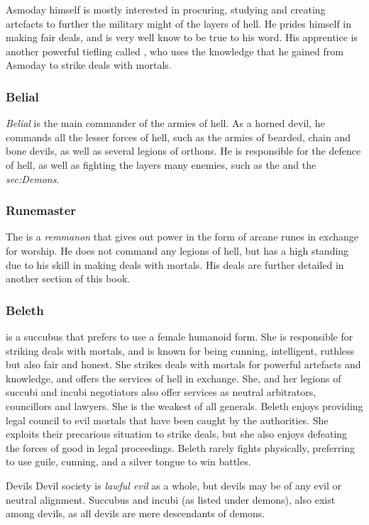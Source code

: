 Asmoday himself is mostly interested in procuring, studying and creating
artefacts to further the military might of the layers of hell. He prides
himself in making fair deals, and is very well know to be true to his word.
His apprentice is another powerful tiefling called , who
uses the knowledge that he gained from Asmoday to strike deals with mortals.

\subsubsection{Belial}
\label{sec:Belial}

\emph{Belial} is the main commander of the armies of hell. As a horned devil,
he commands all the lesser forces of hell, such as the armies of bearded,
chain and bone devils, as well as several legions of orthons. He is
responsible for the defence of hell, as well as fighting the layers many
enemies, such as the  and the \emph{sec:Demons}.

\subsubsection{Runemaster}

The  is a \emph{remmanon} that gives out power in the
form of arcane runes in exchange for worship. He does not command any legions
of hell, but has a high standing due to his skill in making deals with mortals.
His deals are further detailed in another section of this book.

\subsubsection{Beleth}

 is a succubus that prefers to use a female
humanoid form. She is responsible for striking deals with mortals, and is
known for being cunning, intelligent, ruthless but also fair and honest. She
strikes deals with mortals for powerful artefacts and knowledge, and offers
the services of hell in exchange. She, and her legions of succubi and incubi
negotiators also offer services as neutral arbitrators, councillors and
lawyers. She is the weakest of all generals. Beleth enjoys providing legal
council to evil mortals that have been caught by the authorities. She exploits
their precarious situation to strike deals, but she also enjoys defeating
the forces of good in legal proceedings. Beleth rarely fights physically,
preferring to use guile, cunning, and a silver tongue to win battles.

\begin{35e}{Devils}
  Devil society is \emph{lawful evil} as a whole, but devils may be of any
  evil or neutral alignment. Succubus and incubi (as listed under demons),
  also exist among devils, as all devils are mere descendants of demons.
\end{35e}
